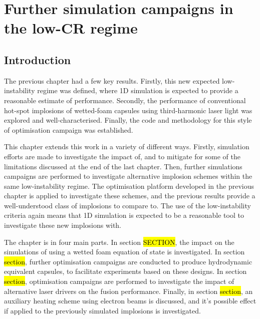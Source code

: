 

\chapter{\label{ch-FurtherSims} Further simulation campaigns in the low-CR regime}

\minitoc

\section{Introduction}
The previous chapter had a few key results. Firstly, this new expected low-instability regime was defined, where 1D simulation is expected to provide a reasonable estimate of performance. Secondly, the performance of conventional hot-spot implosions of wetted-foam capsules using third-harmonic laser light was explored and well-characterised. Finally, the code and methodology for this style of optimisation campaign was established.

This chapter extends this work in a variety of different ways. Firstly, simulation efforts are made to investigate the impact of, and to mitigate for some of the limitations discussed at the end of the last chapter. Then, further simulations campaigns are performed to investigate alternative implosion schemes within the same low-instability regime. The optimisation platform developed in the previous chapter is applied to investigate these schemes, and the previous results provide a well-understood class of implosions to compare to. The use of the low-instability criteria again means that 1D simulation is expected to be a reasonable tool to investigate these new implosions with.

The chapter is in four main parts. In section \hl{SECTION}, the impact on the simulations of using a wetted foam equation of state is investigated. In section \hl{section}, further optimisation campaigns are conducted to produce hydrodynamic equivalent capsules, to facilitate experiments based on these designs. In section \hl{section}, optimisation campaigns are performed to investigate the impact of alternative laser drivers on the fusion performance. Finally, in section \hl{section}, an auxiliary heating scheme using electron beams is discussed, and it's possible effect if applied to the previously simulated implosions is investigated.


